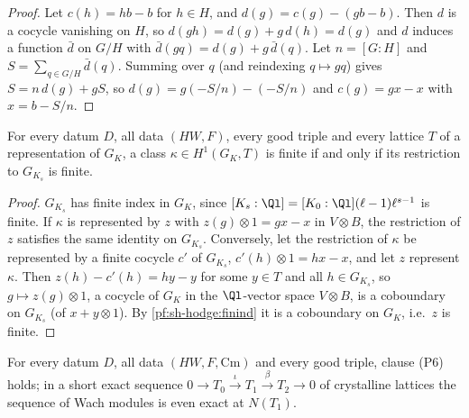 \begin{proof}
Let $c(h)=hb-b$ for $h\in H$, and $d(g)=c(g)-(gb-b)$. Then $d$ is a cocycle vanishing on $H$, so $d(gh)=d(g)+g\,d(h)=d(g)$ and $d$ induces a function
$\bar d$ on $G/H$ with $\bar d(gq)=d(g)+g\,\bar d(q)$. Let $n=[G:H]$ and $S=\sum_{q\in G/H}\bar d(q)$. Summing over $q$ (and reindexing $q\mapsto gq$)
gives $S=n\,d(g)+gS$, so $d(g)=g(-S/n)-(-S/n)$ and $c(g)=gx-x$ with $x=b-S/n$.
\end{proof}

\begin{proposition}[Clause (H2)]\label{pf:sh-hodge:H2}
For every datum $D$, all data $(HW,F)$, every good triple and every lattice $T$ of a representation of $G_K$, a class $\kappa\in H^1(G_K,T)$ is finite if and
only if its restriction to $G_{K_s}$ is finite.
\end{proposition}

\begin{proof}
$G_{K_s}$ has finite index in $G_K$, since $[K_s:\Ql]=[K_0:\Ql](\ell-1)\ell^{s-1}$ is finite. If $\kappa$ is represented by $z$ with $z(g)\otimes1=gx-x$ in
$V\otimes B$, the restriction of $z$ satisfies the same identity on $G_{K_s}$. Conversely, let the restriction of $\kappa$ be represented by a finite cocycle
$c'$ of $G_{K_s}$, $c'(h)\otimes1=hx-x$, and let $z$ represent $\kappa$. Then $z(h)-c'(h)=hy-y$ for some $y\in T$ and all $h\in G_{K_s}$, so $g\mapsto z(g)
\otimes1$, a cocycle of $G_K$ in the $\Ql$-vector space $V\otimes B$, is a coboundary on $G_{K_s}$ (of $x+y\otimes1$). By \cref{pf:sh-hodge:finind} it is a
coboundary on $G_K$, i.e.\ $z$ is finite.
\end{proof}

\begin{proposition}[Clause (P6)]\label{pf:sh-hodge:P6}
For every datum $D$, all data $(HW,F,\mathrm{Cm})$ and every good triple, clause (P6) holds; in a short exact sequence $0\to T_0\xrightarrow{\iota}T_1
\xrightarrow{\beta}T_2\to0$ of crystalline lattices the sequence of Wach modules is even exact at $N(T_1)$.
\end{proposition}


